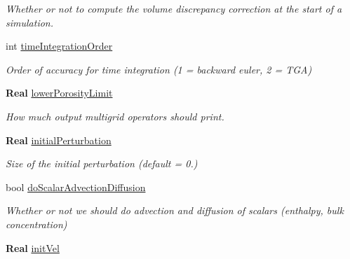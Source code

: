\begin{DoxyCompactItemize}
\begin{DoxyCompactList}\small\item\em Whether or not to compute the volume discrepancy correction at the start of a simulation. \end{DoxyCompactList}\item 
\mbox{\label{struct_mushy_layer_options_a49077940c621196e64ed753633096164}} 
int \hyperlink{struct_mushy_layer_options_a49077940c621196e64ed753633096164}{time\+Integration\+Order}
\begin{DoxyCompactList}\small\item\em Order of accuracy for time integration (1 = backward euler, 2 = T\+GA) \end{DoxyCompactList}\item 
\textbf{ Real} \hyperlink{struct_mushy_layer_options_a1599e6fe13b0dc4c385cd1c835507bc5}{lower\+Porosity\+Limit}
\begin{DoxyCompactList}\small\item\em How much output multigrid operators should print. \end{DoxyCompactList}\item 
\mbox{\label{struct_mushy_layer_options_a1ce91441dbd9727f45134ef8fdb64018}} 
\textbf{ Real} \hyperlink{struct_mushy_layer_options_a1ce91441dbd9727f45134ef8fdb64018}{initial\+Perturbation}
\begin{DoxyCompactList}\small\item\em Size of the initial perturbation (default = 0.) \end{DoxyCompactList}\item 
\mbox{\label{struct_mushy_layer_options_a8629328cf1903d0bd0de7b692bfa29f3}} 
bool \hyperlink{struct_mushy_layer_options_a8629328cf1903d0bd0de7b692bfa29f3}{do\+Scalar\+Advection\+Diffusion}
\begin{DoxyCompactList}\small\item\em Whether or not we should do advection and diffusion of scalars (enthalpy, bulk concentration) \end{DoxyCompactList}\item 
\mbox{\label{struct_mushy_layer_options_a79ef75374fbdd1d7be8e2888b532248f}} 
\textbf{ Real} \hyperlink{struct_mushy_layer_options_a79ef75374fbdd1d7be8e2888b532248f}{init\+Vel}

\end{DoxyCompactItemize}
